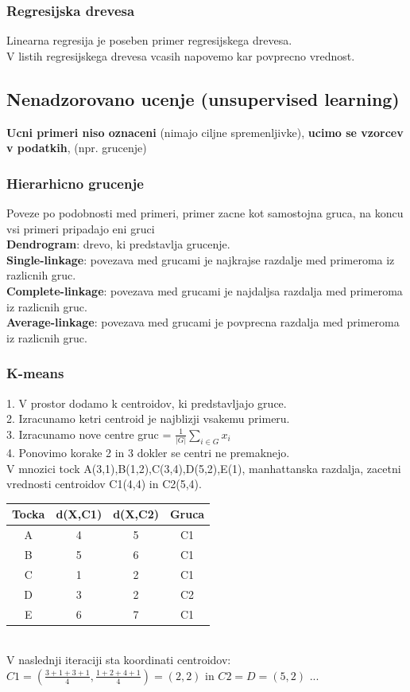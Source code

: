 \subsubsection{Regresijska drevesa}
Linearna regresija je poseben primer regresijskega drevesa.\\
V listih regresijskega drevesa vcasih napovemo kar povprecno vrednost.

\subsection{Nenadzorovano ucenje (unsupervised learning)}
\textbf{Ucni primeri niso oznaceni} (nimajo ciljne spremenljivke),
\textbf{ucimo se vzorcev v podatkih}, (npr. grucenje)

\subsubsection{Hierarhicno grucenje}
Poveze po podobnosti med primeri, primer zacne kot samostojna gruca, na koncu vsi primeri pripadajo eni gruci\\
\textbf{Dendrogram}: drevo, ki predstavlja grucenje.\\
\textbf{Single-linkage}: povezava med grucami je najkrajse razdalje med primeroma iz razlicnih gruc.\\
\textbf{Complete-linkage}: povezava med grucami je najdaljsa razdalja med primeroma iz razlicnih gruc.\\
\textbf{Average-linkage}: povezava med grucami je povprecna razdalja med primeroma iz razlicnih gruc.

\subsubsection{K-means}
1. V prostor dodamo k centroidov, ki predstavljajo gruce.\\
2. Izracunamo ketri centroid je najblizji vsakemu primeru.\\
3. Izracunamo nove centre gruc = $\frac{1}{|G|}\sum\limits_{i\in G} x_i$\\
4. Ponovimo korake 2 in 3 dokler se centri ne premaknejo.\\
V mnozici tock A(3,1),B(1,2),C(3,4),D(5,2),E(1), manhattanska razdalja, zacetni vrednosti centroidov C1(4,4) in C2(5,4).\\
\begin{tabular}{c|c|c|c}
    Tocka & d(X,C1) & d(X,C2) & Gruca\\
    \hline
    A & 4 & 5 & C1\\ 
    B & 5 & 6 & C1\\
    C & 1 & 2 & C1\\
    D & 3 & 2 & C2\\
    E & 6 & 7 & C1\\
    \hline
\end{tabular}\\
V naslednji iteraciji sta koordinati centroidov:\\
$C1=(\frac{3+1+3+1}{4},\frac{1+2+4+1}{4})=(2,2)$ \; in \; $C2=D=(5,2)$ ...

